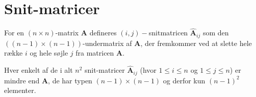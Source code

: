 \section{Snit-matricer}

\begin{definition}[Snitmatricer] \label{tn5.defSnitMat}
For en $(n \times n)$-matrix $\mathbf{A}$ defineres $(i,j)-$snitmatricen $\widehat{\mathbf{A}}_{ij}$ som den $((n-1) \times (n-1))$-undermatrix af $\mathbf{A}$, der fremkommer ved at slette hele række $i$ og hele søjle $j$ fra matricen $\mathbf{A}$.
\end{definition}

\begin{think}
Hver enkelt af de i alt $n^{2}$ snit-matricer $\widehat{\mathbf{A}}_{ij}$ (hvor $1\leq i \leq n$ og $1\leq j \leq n$)  er mindre end $\mathbf{A}$, de har typen $(n-1) \times (n-1)$ og derfor kun $(n-1)^{2}$ elementer.
\end{think}

